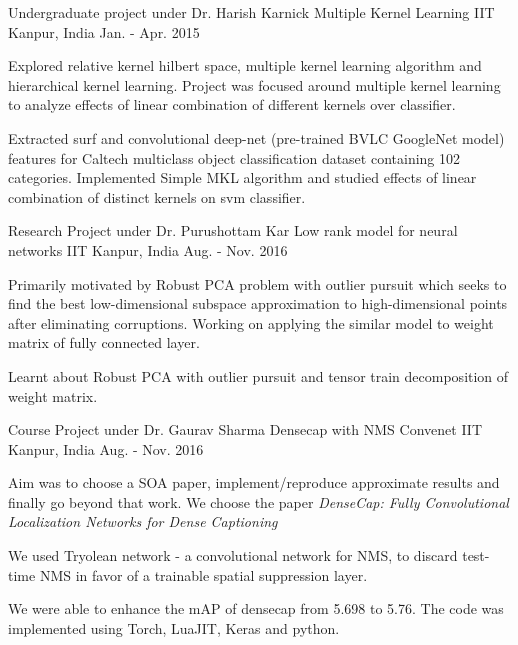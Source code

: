 \begin{cventries}
	
	\cventry
	{Undergraduate project under Dr. Harish Karnick} %
	{Multiple Kernel Learning} %
	{IIT Kanpur, India} %
	{Jan. - Apr. 2015} %
	{
		\begin{cvitems} %
			 \item {Explored relative kernel hilbert space, multiple kernel learning algorithm and hierarchical kernel learning. Project was focused around multiple kernel learning to analyze effects of linear combination of different kernels over classifier.}
			 \item {Extracted surf and convolutional deep-net (pre-trained BVLC GoogleNet model) features for Caltech multiclass object classification dataset containing 102 categories. Implemented Simple MKL algorithm and studied effects of linear combination of distinct kernels on svm classifier.}
		\end{cvitems}
	}
	
	\cventry
	{Research Project under Dr. Purushottam Kar} %
	{Low rank model for neural networks} %
	{IIT Kanpur, India} %
	{Aug. - Nov. 2016} %
	{
		\begin{cvitems} %
			\item { Primarily motivated by Robust PCA problem with outlier pursuit which seeks to find the best low-dimensional subspace approximation to high-dimensional points after eliminating corruptions. Working on applying the similar model to weight matrix of fully connected layer.}
			\item {Learnt about Robust PCA with outlier pursuit and tensor train decomposition of weight matrix.}
		\end{cvitems}
	}
	
	

	
	\cventry
	{Course Project under Dr. Gaurav Sharma} %
	{Densecap with NMS Convenet} %
	{IIT Kanpur, India} %
	{Aug. - Nov. 2016} %
	{
		\begin{cvitems} %
			\item Aim was to choose a SOA paper, implement/reproduce approximate results and finally go beyond that work. We choose the paper \textit{DenseCap: Fully Convolutional Localization Networks for Dense Captioning}
			\item We used Tryolean network - a convolutional network for NMS, to discard test-time NMS in favor of a trainable spatial suppression layer. 
			\item We were able to enhance the mAP of densecap from 5.698 to 5.76. The code was implemented using Torch, LuaJIT, Keras and python. 
		\end{cvitems}
	}
	

\end{cventries}
